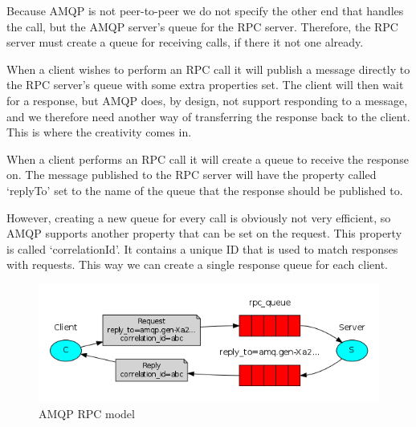 Because AMQP is not peer-to-peer we do not specify the other end that handles the call, but the AMQP server's queue for the RPC server. Therefore, the RPC server must create a queue for receiving calls, if there it not one already.

When a client wishes to perform an RPC call it will publish a message directly to the RPC server's queue with some extra properties set. The client will then wait for a response, but AMQP does, by design, not support responding to a message, and we therefore need another way of transferring the response back to the client. This is where the creativity comes in.

When a client performs an RPC call it will create a queue to receive the response on. The message published to the RPC server will have the property called `replyTo' set to the name of the queue that the response should be published to.

However, creating a new queue for every call is obviously not very efficient, so AMQP supports another property that can be set on the request. This property is called `correlationId'. It contains a unique ID that is used to match responses with requests. This way we can create a single response queue for each client.

\begin{figure}[H]
  \includegraphics[width=\textwidth]{illustrations/amqp-rpc.png}
  \caption{AMQP RPC model\cite{AMQPRPC}}
\end{figure}

\label{subsubsec:AMQPRPC}
\newpage
